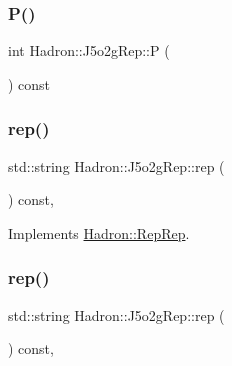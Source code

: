 \mbox{\label{structHadron_1_1J5o2gRep_a6ffd7d1f06f5779fdf3ecdd30a5f0f10}} 
\subsubsection{\texorpdfstring{P()}{P()}\hspace{0.1cm}{\footnotesize\ttfamily [2/2]}}
{\footnotesize\ttfamily int Hadron\+::\+J5o2g\+Rep\+::P (\begin{DoxyParamCaption}{ }\end{DoxyParamCaption}) const\hspace{0.3cm}{\ttfamily [inline]}}

\mbox{\label{structHadron_1_1J5o2gRep_aac8af1cb5d895e8c83ccdaa520338573}} 
\subsubsection{\texorpdfstring{rep()}{rep()}\hspace{0.1cm}{\footnotesize\ttfamily [1/2]}}
{\footnotesize\ttfamily std\+::string Hadron\+::\+J5o2g\+Rep\+::rep (\begin{DoxyParamCaption}{ }\end{DoxyParamCaption}) const\hspace{0.3cm}{\ttfamily [inline]}, {\ttfamily [virtual]}}



Implements \mbox{\hyperlink{structHadron_1_1RepRep_ab3213025f6de249f7095892109575fde}{Hadron\+::\+Rep\+Rep}}.

\mbox{\label{structHadron_1_1J5o2gRep_aac8af1cb5d895e8c83ccdaa520338573}} 
\subsubsection{\texorpdfstring{rep()}{rep()}\hspace{0.1cm}{\footnotesize\ttfamily [2/2]}}
{\footnotesize\ttfamily std\+::string Hadron\+::\+J5o2g\+Rep\+::rep (\begin{DoxyParamCaption}{ }\end{DoxyParamCaption}) const\hspace{0.3cm}{\ttfamily [inline]}, {\ttfamily [virtual]}}



